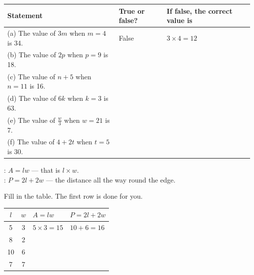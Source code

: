 \documentclass[12pt,a4paper]{article}
\begin{document}
\vspace{7pt}
\noindent
\begin{tabularx}{\textwidth}{|X|>{\raggedright\arraybackslash}p{2.0cm}|>{\raggedright\arraybackslash}p{5.0cm}|}
  \hline
  \textbf{Statement} & \textbf{True or false?} & \textbf{If false, the correct
  value is} \\
  \hline
  (a) The value of $3m$ when $m = 4$ is 34. \rule[-0.65em]{0pt}{2.0em}
    & False & $3 \times 4 = 12$ \\ \hline
  (b) The value of $2p$ when $p = 9$ is 18. \rule[-1.5em]{0pt}{4.0em} & & \\ \hline
  (c) The value of $n + 5$ when $n = 11$ is 16. \rule[-1.5em]{0pt}{4.0em} & & \\ \hline
  (d) The value of $6k$ when $k = 3$ is 63. \rule[-1.5em]{0pt}{4.0em} & & \\ \hline
  (e) The value of $\frac{w}{3}$ when $w = 21$ is 7. \rule[-1.5em]{0pt}{4.0em} & & \\ \hline
  (f) The value of $4 + 2t$ when $t = 5$ is 30. \rule[-1.5em]{0pt}{4.0em} & & \\ \hline
\end{tabularx}

\vspace{7pt}


\begin{remember}
  : \; $A = lw$ \; --- that is $l \times w$. \\
  : \; $P = 2l + 2w$ \; --- the distance all the way round the edge.
\end{remember}

\noindent Fill in the table. The first row is done for you.

\vspace{7pt}
\noindent
\begin{tabularx}{\textwidth}{|c|c|X|X|}
  \hline
  \textbf{$l$} & \textbf{$w$} & \textbf{$A = lw$} & \textbf{$P = 2l + 2w$} \\
  \hline
  5 \rule[-0.65em]{0pt}{2.0em} & 3 & $5 \times 3 = 15$ & $10 + 6 = 16$ \\ \hline
  8 \rule[-0.9em]{0pt}{2.5em}  & 2 & & \\ \hline
  10 \rule[-0.9em]{0pt}{2.5em} & 6 & & \\ \hline
  7 \rule[-0.9em]{0pt}{2.5em}  & 7 & & \\ \hline
\end{tabularx}
\end{document}
